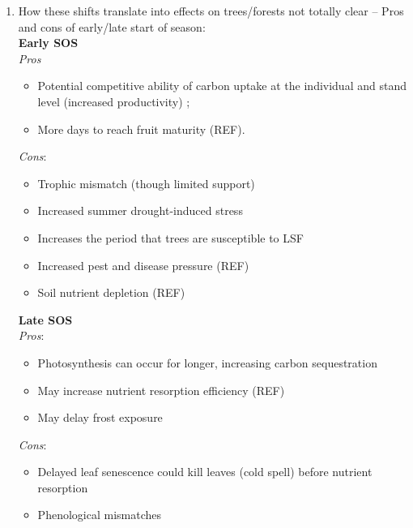 \documentclass{article}
\begin{document}
\begin{enumerate}
	\item How these shifts translate into effects on trees/forests not totally clear -- Pros and cons of early/late start of season: \\  %
		\textbf{Early SOS}\\
		\textit{Pros} 
			\begin {itemize}
				\item Potential competitive ability of carbon uptake at the individual and stand level (increased productivity) \cite{estiarte_alteration_2015}; 
				\item More days to reach fruit maturity (REF). %
			\end {itemize}
		\textit{Cons}: 
			\begin {itemize}
				\item Trophic mismatch (though limited support) \cite{loughnan_phenology_2024}
				\item Increased summer drought-induced stress \cite{li_widespread_2023}
				\item Increases the period that trees are susceptible to LSF \cite{meyer_frost_2024}
				\item Increased pest and disease pressure (REF)
				\item Soil nutrient depletion (REF)
			\end {itemize}
		\textbf{Late SOS} \\
		\textit{Pros}: 
			\begin {itemize}
				\item Photosynthesis can occur for longer, increasing carbon sequestration \cite{keenan_net_2014}
				\item May increase nutrient resorption efficiency (REF)
				\item May delay frost exposure \cite{gunderson_forest_2012}
			\end {itemize}
		\textit{Cons}: 
			\begin {itemize}
				\item Delayed leaf senescence could kill leaves (cold spell) before nutrient resorption \cite{estiarte_alteration_2015}
				\item Phenological mismatches \cite{piao_plant_2019}

\end{itemize}
\end{enumerate}
\end{document}
